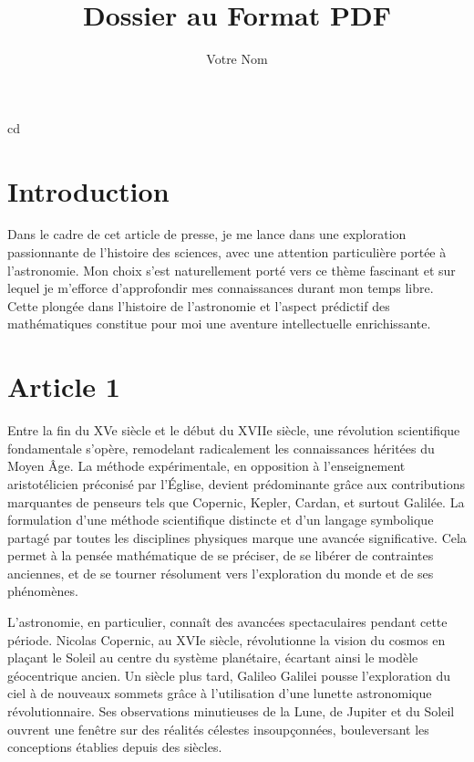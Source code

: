 cd\documentclass{article}
\title{Dossier au Format PDF}
\author{Votre Nom}
\begin{document}
\maketitle

\tableofcontents %
\newpage

\section{Introduction}
 Dans le cadre de cet article de presse, je me lance dans une exploration passionnante de l'histoire des sciences, avec une attention particulière portée à l'astronomie. Mon choix s'est naturellement porté vers ce thème fascinant et sur lequel je m'efforce d'approfondir mes connaissances durant mon temps libre. Cette plongée dans l'histoire de l'astronomie et l'aspect prédictif des mathématiques constitue pour moi une aventure intellectuelle enrichissante. 

\section{Article 1} 

Entre la fin du XVe siècle et le début du XVIIe siècle, une révolution scientifique fondamentale s'opère, remodelant radicalement les connaissances héritées du Moyen Âge. La méthode expérimentale, en opposition à l'enseignement aristotélicien préconisé par l'Église, devient prédominante grâce aux contributions marquantes de penseurs tels que Copernic, Kepler, Cardan, et surtout Galilée. La formulation d'une méthode scientifique distincte et d'un langage symbolique partagé par toutes les disciplines physiques marque une avancée significative. Cela permet à la pensée mathématique de se préciser, de se libérer de contraintes anciennes, et de se tourner résolument vers l'exploration du monde et de ses phénomènes.

L'astronomie, en particulier, connaît des avancées spectaculaires pendant cette période. Nicolas Copernic, au XVIe siècle, révolutionne la vision du cosmos en plaçant le Soleil au centre du système planétaire, écartant ainsi le modèle géocentrique ancien. Un siècle plus tard, Galileo Galilei pousse l'exploration du ciel à de nouveaux sommets grâce à l'utilisation d'une lunette astronomique révolutionnaire. Ses observations minutieuses de la Lune, de Jupiter et du Soleil ouvrent une fenêtre sur des réalités célestes insoupçonnées, bouleversant les conceptions établies depuis des siècles.
\end{document}
